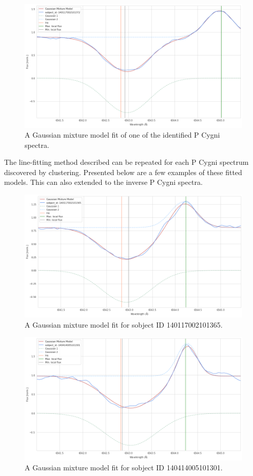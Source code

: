 \begin{figure}[!htb]
\centering
\includegraphics[scale=0.45]{figures/p cugni fitted.png}
\caption{A Gaussian mixture model fit of one of the identified P Cygni spectra.}
\end{figure}

The line-fitting method described can be repeated for each P Cygni spectrum discovered by clustering. Presented below are a few examples of these fitted models. This can also extended to the inverse P Cygni spectra.

\begin{figure}[!htb]
\centering
\includegraphics[scale=0.45]{figures/p cygni fitted 2.png}
\caption{A Gaussian mixture model fit for sobject ID 140117002101365. }
\end{figure}

\begin{figure}[!htb]
\centering
\includegraphics[scale=0.45]{figures/p cygni fitted 3.png}
\caption{A Gaussian mixture model fit for sobject ID 140414005101301. }
\end{figure}

